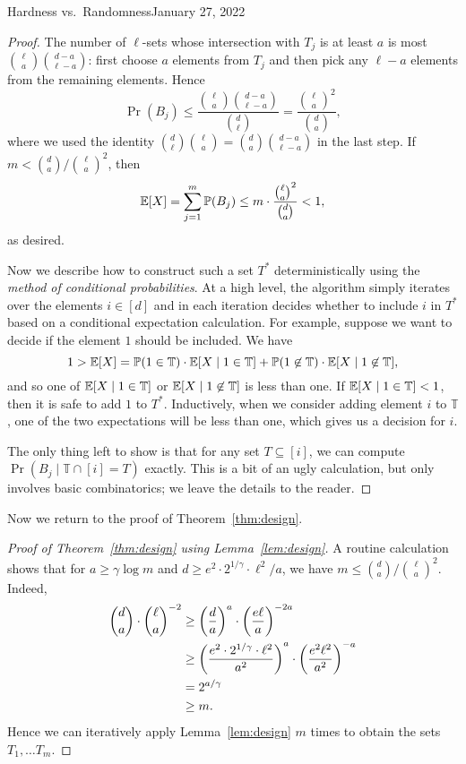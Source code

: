 \begin{lecture}{2}{Hardness vs.\ Randomness}{January 27, 2022}
\begin{proof}
  The number of $\ell$-sets whose intersection with $T_j$ is at least $a$ is
  most $\binom{\ell}{a}\binom{d - a}{\ell - a}$: first choose $a$ elements from
  $T_j$ and then pick any $\ell - a$ elements from the remaining elements. Hence
  \[
    \Pr(B_j) \le \frac{\binom{\ell}{a}\binom{d - a}{\ell - a}}{\binom{d}{\ell}} =
    \frac{\binom{\ell}{a}^2}{\binom{d}{a}},
  \]
  where we used the identity $\binom{d}{\ell}\binom{\ell}{a} =
  \binom{d}{a}\binom{d - a}{\ell - a}$ in the last step. If $m < \binom{d}{a} /
  \binom{\ell}{a}^2$, then \[
    \Exp\brac*{X} =
    \sum_{j=1}^m \Pr(B_j) \le m \cdot \frac{\binom{\ell}{a}^2}{\binom{d}{a}} < 1,
  \]
  as desired.

  Now we describe how to construct such a set $T^*$ deterministically using the
  \emph{method of conditional probabilities}. At a high level, the algorithm
  simply iterates over the elements $i \in [d]$ and in each iteration decides
  whether to include $i$ in $T^*$ based on a conditional expectation
  calculation. For example, suppose we want to decide if the element $1$ should
  be included. We have \[
    1 > \Exp\brac*{X} = \Pr(1 \in \mathbb{T}) \cdot \Exp\brac*{X \mid 1 \in \mathbb{T}} 
      + \Pr(1 \not\in \mathbb{T}) \cdot \Exp\brac*{X \mid 1 \not\in \mathbb{T}},
  \]
  and so one of $\Exp\brac{X \mid 1 \in \mathbb{T}}$ or $\Exp\brac{X \mid 1 \not\in
  \mathbb{T}}$ is less than one. If $\Exp\brac{X \mid 1 \in \mathbb{T}} < 1$,
  then it is safe to add $1$ to $T^*$. Inductively, when we consider adding
  element $i$ to $\mathbb{T}$, one of the two expectations will be less than
  one, which gives us a decision for $i$.

  The only thing left to show is that for any set $T \subseteq [i]$, we can
  compute $\Pr(B_j \mid \mathbb{T} \cap [i] = T)$ exactly. This is a bit of an
  ugly calculation, but only involves basic combinatorics; we leave the details
  to the reader.
\end{proof}

Now we return to the proof of Theorem~\ref{thm:design}.

\begin{proof}[Proof of Theorem~\ref{thm:design} using Lemma~\ref{lem:design}]
  A routine calculation shows that for $a \ge \gamma \log{m}$ and $d \ge e^2
  \cdot 2^{1/\gamma} \cdot \ell^2/a$, we have $m \le \binom{d}{a} /
  \binom{\ell}{a}^2$. Indeed,
  \begin{align*}
    \binom{d}{a} \cdot \binom{\ell}{a}^{-2}
    &\ge \paren*{\frac{d}{a}}^a \cdot \paren*{\frac{e \ell}{a}}^{-2a}\\
    &\ge \paren*{\frac{e^2 \cdot 2^{1/\gamma} \cdot \ell^2}{a^2}}^{a} \cdot \paren*{\frac{e^2 \ell^2}{a^2}}^{-a}\\
    &= 2^{a / \gamma}\\
    &\ge m.
  \end{align*}
  Hence we can iteratively apply Lemma~\ref{lem:design} $m$ times to obtain the
  sets $T_1, \dots T_m$.
\end{proof}

\end{lecture}
